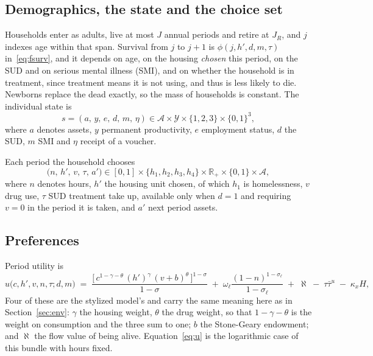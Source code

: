 \documentclass[10pt]{article}
\begin{document}
\subsection{Demographics, the state and the choice set}

Households enter as adults, live at most $J$ annual periods and retire at
$J_R$, and $j$ indexes age within that span. Survival from $j$ to $j+1$ is
$\phi(j,h',d,m,\tau)$ in~\eqref{eq:fsurv}, and it depends on age, on the housing
\emph{chosen} this period, on the SUD and on serious mental illness (SMI),
and on whether the household is in treatment, since treatment means it is
not using, and thus is less likely to die. Newborns replace the dead
exactly, so the mass of households is constant. The individual
state is
\begin{equation}\label{eq:fstate}
s=(a,\,y,\,e,\,d,\,m,\,\eta)\in
\mathcal A\times\mathcal Y\times\{1,2,3\}\times\{0,1\}^3 ,
\end{equation}
where $a$ denotes assets, $y$ permanent productivity, $e$ employment status,
$d$ the SUD, $m$ SMI and $\eta$ receipt
of a voucher.

Each period the household chooses
\begin{equation}\label{eq:fchoice}
\big(n,\,h',\,v,\,\tau,\,a'\big)\in
[0,1]\times\{h_1,h_2,h_3,h_4\}\times\mathbb R_+\times\{0,1\}\times\mathcal A ,
\end{equation}
where $n$ denotes hours, $h'$ the housing unit chosen, of which $h_1$ is
homelessness, $v$ drug use, $\tau$ SUD treatment take up, available only when
$d=1$ and requiring $v=0$ in the period it is taken, and $a'$ next period
assets.

\subsection{Preferences}\label{sec:fprefs}

Period utility is
\begin{equation}\label{eq:futil}
u\big(c,h',v,n,\tau;d,m\big) \;=\;
\frac{\big[\,c^{1-\gamma-\theta}\,(h')^{\gamma}\,(v+b)^{\theta}\,\big]^{1-\sigma}}{1-\sigma}
\;+\;\omega_{\ell}\frac{(1-n)^{1-\sigma_{\ell}}}{1-\sigma_{\ell}}
\;+\;\aleph\;-\;\tau\bar\tau^{u}\;-\;\kappa_x H,
\end{equation}
Four of these are the stylized model's and carry the same meaning here as
in Section~\ref{sec:env}: $\gamma$ the housing weight, $\theta$ the drug weight,
so that $1-\gamma-\theta$ is the weight on consumption and the three sum to one;
$b$ the Stone-Geary endowment; and $\aleph$ the flow value of being alive.
Equation~\eqref{eq:u} is the logarithmic case of this bundle with hours fixed.
\end{document}
